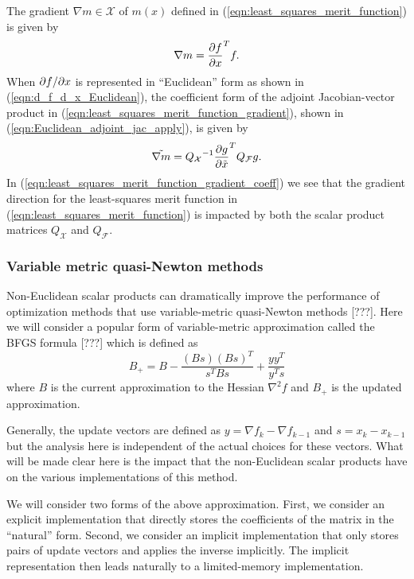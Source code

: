 The gradient $\nabla m\in\mathcal{X}$ of $m(x)$ defined in
(\ref{eqn:least_squares_merit_function}) is given by
%
\begin{equation}
\nabla m = \displaystyle{\frac{\partial f}{\partial x}}^T f.
\label{eqn:least_squares_merit_function_gradient}
\end{equation}
%
When $\partial f / \partial x$ is represented in ``Euclidean'' form as shown in
(\ref{eqn:d_f_d_x_Euclidean}), the coefficient form of the adjoint
Jacobian-vector product in (\ref{eqn:least_squares_merit_function_gradient}),
shown in (\ref{eqn:Euclidean_adjoint_jac_apply}), is given by
%
\begin{equation}
\tilde{\nabla m} = {Q_{\mathcal{X}}}^{-1} {\displaystyle{\frac{\partial g}{\partial \tilde{x}}}}^T Q_{\mathcal{F}} g.
\label{eqn:least_squares_merit_function_gradient_coeff}
\end{equation}
%
In (\ref{eqn:least_squares_merit_function_gradient_coeff}) we see that the
gradient direction for the least-squares merit function in
(\ref{eqn:least_squares_merit_function}) is impacted by both the scalar
product matrices $Q_{\mathcal{X}}$ and $Q_{\mathcal{F}}$.

\subsubsection{Variable metric quasi-Newton methods}
\label{sec:variable_metric_quasi_Newton_methods}

Non-Euclidean scalar products can dramatically improve the performance of
optimization methods that use variable-metric quasi-Newton methods [???].
Here we will consider a popular form of variable-metric approximation called
the BFGS formula [???] which is defined as
%
\[
B_+ = B - \frac{(B s) (B s)^T}{s^T B s} + \frac{y y^T}{y^T s}
\label{eqn:bfgs_update}
\]
%
where $B$ is the current approximation to the Hessian $\nabla^2 f$ and $B_+$
is the updated approximation.

Generally, the update vectors are defined as $y = {}\nabla f_k - {}\nabla
f_{k-1}$ and $s = x_k - x_{k-1}$ but the analysis here is independent of the
actual choices for these vectors.  What will be made clear here is the impact
that the non-Euclidean scalar products have on the various implementations of
this method.

We will consider two forms of the above approximation.  First, we consider an
explicit implementation that directly stores the coefficients of the matrix in
the ``natural'' form.  Second, we consider an implicit implementation that
only stores pairs of update vectors and applies the inverse implicitly.  The
implicit representation then leads naturally to a limited-memory
implementation.

